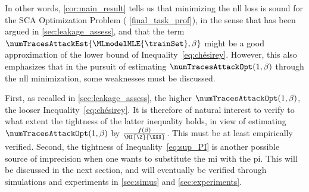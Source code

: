 In other words, \autoref{cor:main_result} tells us that minimizing the \gls{nll} loss is sound for the SCA Optimization Problem (\ie{} \autoref{final_task_prof}), in the sense that has been argued in \autoref{sec:leakage_assess}, and that the term \(\numTracesAttackEst{\MLmodelMLE{\trainSet}, \beta}\) might be a good approximation of the lower bound of Inequality~\eqref{eq:chésirey}.
However, this also emphasizes that in the pursuit of estimating \(\numTracesAttackOpt(1, \beta)\) through the \gls{nll} minimization, some weaknesses must be discussed.

First, as recalled in \autoref{sec:leakage_assess}, the higher \(\numTracesAttackOpt(1, \beta)\), the looser Inequality~\eqref{eq:chésirey}.
It is therefore of natural interest to verify to what extent the tightness of the latter inequality holds, in view of estimating \(\numTracesAttackOpt(1, \beta)\) by \(\frac{f(\beta)}{\MI{\Z}{\XXX}}\).
This must be at least empirically verified.
Second, the tightness of Inequality~\eqref{eq:sup_PI} is another possible source of imprecision when one wants to substitute the \gls{mi} with the \gls{pi}.
This will be discussed in the next section, and will eventually be verified through simulations and experiments in \autoref{sec:simus} and \autoref{sec:experiments}.